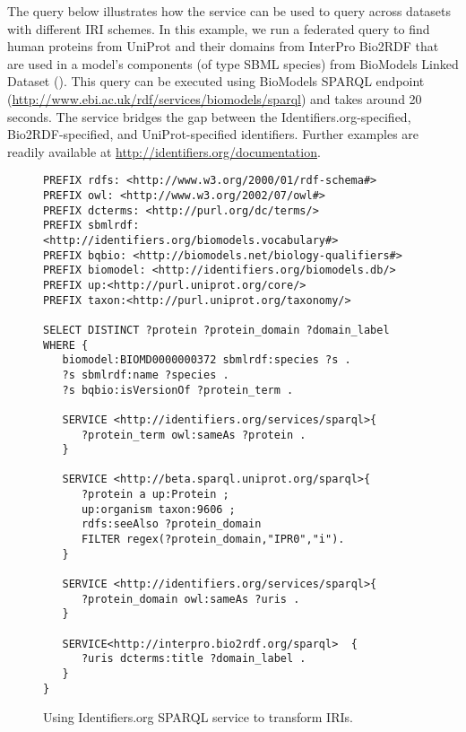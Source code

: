 \documentclass{bioinfo}
\begin{document}
The query below illustrates how the service can be used to query across datasets with different IRI schemes. In this example, we run a federated query to find human proteins from UniProt and their domains from InterPro Bio2RDF that are used in a model's components (of type SBML species) from BioModels Linked Dataset (\cite{Wimalaratne2014}). This query can be executed using BioModels SPARQL endpoint 
(\href{http://www.ebi.ac.uk/rdf/services/biomodels/sparql}{http://www.ebi.ac.uk/rdf/services/biomodels/sparql}) and takes around 20 seconds. The service bridges the gap between the Identifiers.org-specified, Bio2RDF-specified, and UniProt-specified identifiers. Further examples are readily available at \href{http://identifiers.org/documentation}{http://identifiers.org/documentation}.

\begin{figure}[h]
{\scriptsize
\begin{verbatim}
PREFIX rdfs: <http://www.w3.org/2000/01/rdf-schema#>
PREFIX owl: <http://www.w3.org/2002/07/owl#>
PREFIX dcterms: <http://purl.org/dc/terms/>
PREFIX sbmlrdf: <http://identifiers.org/biomodels.vocabulary#>
PREFIX bqbio: <http://biomodels.net/biology-qualifiers#>
PREFIX biomodel: <http://identifiers.org/biomodels.db/>
PREFIX up:<http://purl.uniprot.org/core/> 
PREFIX taxon:<http://purl.uniprot.org/taxonomy/> 

SELECT DISTINCT ?protein ?protein_domain ?domain_label WHERE {
   biomodel:BIOMD0000000372 sbmlrdf:species ?s . 
   ?s sbmlrdf:name ?species .
   ?s bqbio:isVersionOf ?protein_term .

   SERVICE <http://identifiers.org/services/sparql>{
      ?protein_term owl:sameAs ?protein .
   }

   SERVICE <http://beta.sparql.uniprot.org/sparql>{
      ?protein a up:Protein ; 
      up:organism taxon:9606 ;
      rdfs:seeAlso ?protein_domain 
      FILTER regex(?protein_domain,"IPR0","i").
   }

   SERVICE <http://identifiers.org/services/sparql>{
      ?protein_domain owl:sameAs ?uris .
   }

   SERVICE<http://interpro.bio2rdf.org/sparql>  {
      ?uris dcterms:title ?domain_label .
   }      
}
\end{verbatim}
}
\caption{Using Identifiers.org SPARQL service to transform IRIs.}
\label{example1}
\end{figure}
   
\end{document}
